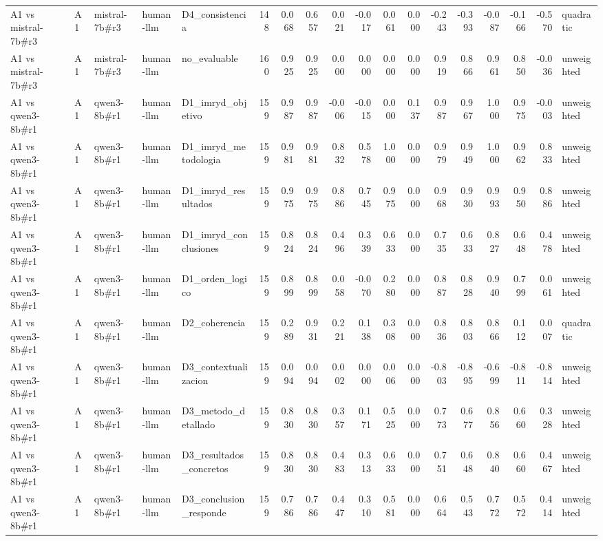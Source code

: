 \begin{table}
{\begin{tabular}{lllllrrrrrrrrrrrrl}
A1 vs mistral-7b\#r3 & A1 & mistral-7b\#r3 & human-llm & D4\_consistencia & 148 & 0.068 & 0.657 & 0.021 & -0.017 & 0.061 & 0.000 & -0.243 & -0.393 & -0.087 & -0.166 & -0.570 & quadratic \\
A1 vs mistral-7b\#r3 & A1 & mistral-7b\#r3 & human-llm & no\_evaluable & 160 & 0.925 & 0.925 & 0.000 & 0.000 & 0.000 & 0.000 & 0.919 & 0.866 & 0.961 & 0.850 & -0.036 & unweighted \\
A1 vs qwen3-8b\#r1 & A1 & qwen3-8b\#r1 & human-llm & D1\_imryd\_objetivo & 159 & 0.987 & 0.987 & -0.006 & -0.015 & 0.000 & 0.137 & 0.987 & 0.967 & 1.000 & 0.975 & -0.003 & unweighted \\
A1 vs qwen3-8b\#r1 & A1 & qwen3-8b\#r1 & human-llm & D1\_imryd\_metodologia & 159 & 0.981 & 0.981 & 0.832 & 0.578 & 1.000 & 0.000 & 0.979 & 0.949 & 1.000 & 0.962 & 0.833 & unweighted \\
A1 vs qwen3-8b\#r1 & A1 & qwen3-8b\#r1 & human-llm & D1\_imryd\_resultados & 159 & 0.975 & 0.975 & 0.886 & 0.745 & 0.975 & 0.000 & 0.968 & 0.930 & 0.993 & 0.950 & 0.886 & unweighted \\
A1 vs qwen3-8b\#r1 & A1 & qwen3-8b\#r1 & human-llm & D1\_imryd\_conclusiones & 159 & 0.824 & 0.824 & 0.496 & 0.339 & 0.633 & 0.000 & 0.735 & 0.633 & 0.827 & 0.648 & 0.478 & unweighted \\
A1 vs qwen3-8b\#r1 & A1 & qwen3-8b\#r1 & human-llm & D1\_orden\_logico & 159 & 0.899 & 0.899 & 0.058 & -0.070 & 0.280 & 0.000 & 0.887 & 0.828 & 0.940 & 0.799 & 0.061 & unweighted \\
A1 vs qwen3-8b\#r1 & A1 & qwen3-8b\#r1 & human-llm & D2\_coherencia & 159 & 0.289 & 0.931 & 0.221 & 0.138 & 0.308 & 0.000 & 0.836 & 0.803 & 0.866 & 0.112 & 0.007 & quadratic \\
A1 vs qwen3-8b\#r1 & A1 & qwen3-8b\#r1 & human-llm & D3\_contextualizacion & 159 & 0.094 & 0.094 & 0.002 & 0.000 & 0.006 & 0.000 & -0.803 & -0.895 & -0.699 & -0.811 & -0.814 & unweighted \\
A1 vs qwen3-8b\#r1 & A1 & qwen3-8b\#r1 & human-llm & D3\_metodo\_detallado & 159 & 0.830 & 0.830 & 0.357 & 0.171 & 0.525 & 0.000 & 0.773 & 0.677 & 0.856 & 0.660 & 0.328 & unweighted \\
A1 vs qwen3-8b\#r1 & A1 & qwen3-8b\#r1 & human-llm & D3\_resultados\_concretos & 159 & 0.830 & 0.830 & 0.483 & 0.313 & 0.633 & 0.000 & 0.751 & 0.648 & 0.840 & 0.660 & 0.467 & unweighted \\
A1 vs qwen3-8b\#r1 & A1 & qwen3-8b\#r1 & human-llm & D3\_conclusion\_responde & 159 & 0.786 & 0.786 & 0.447 & 0.310 & 0.581 & 0.000 & 0.664 & 0.543 & 0.772 & 0.572 & 0.414 & unweighted \\

\end{tabular}}
\end{table}
